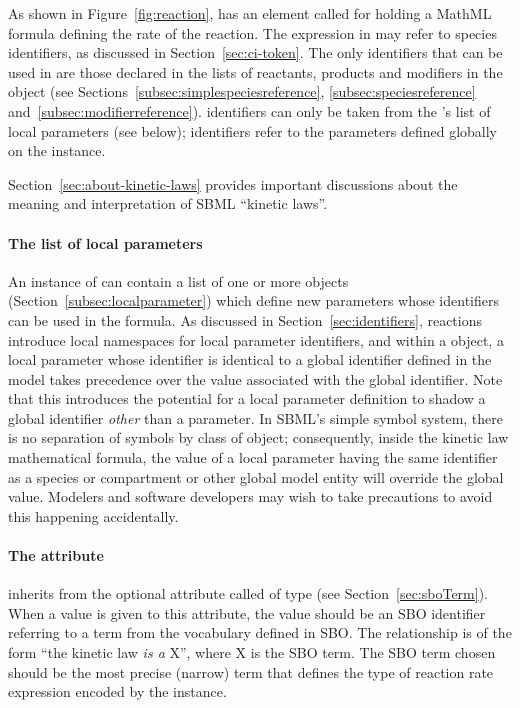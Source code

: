 As shown in Figure~\vref{fig:reaction}, \KineticLaw 
has an element called  for holding a MathML formula
defining the rate of the reaction.  The expression in 
may refer to species identifiers, as discussed in
Section~\ref{sec:ci-token}.  The only \Species identifiers that
can be used in  are those declared in the lists of
reactants, products and modifiers in the \Reaction object (see
Sections~\ref{subsec:simplespeciesreference},
\ref{subsec:speciesreference} and~\ref{subsec:modifierreference}).
\LocalParameter identifiers can only be taken from the \KineticLaw's list of
local parameters (see below); \Parameter identifiers refer to the parameters defined globally on
the \Model instance.

Section~\ref{sec:about-kinetic-laws} provides important
discussions about the meaning and interpretation of SBML ``kinetic
laws''.


\paragraph{The list of local parameters}

An instance of \KineticLaw can contain a list of
one or more \LocalParameter objects (Section~\ref{subsec:localparameter})
which define new parameters whose identifiers can be used in the
 formula.  As discussed in
Section~\ref{sec:identifiers}, reactions introduce local
namespaces for local parameter identifiers, and within a
\KineticLaw object, a local parameter whose identifier is
identical to a global identifier defined in the model takes
precedence over the value associated with
the global identifier.  Note that this introduces the potential
for a local parameter definition to shadow a global identifier
\emph{other} than a parameter.  In SBML's simple symbol system, 
there is no separation of symbols by class of object;
consequently,  inside the kinetic law mathematical
formula, the value of a local parameter having the same
identifier as a species or compartment or other global model
entity will override the global value.  Modelers and software
developers may wish to take precautions to avoid this happening
accidentally.


\paragraph{The  attribute}

\KineticLaw inherits from \SBase the optional attribute
called  of type  (see
Section~\ref{sec:sboTerm}).  When a value is given to this
attribute, the value should be an SBO identifier referring
to a term from the \sboratelaw vocabulary defined in SBO.  The
relationship is of the form ``the kinetic law \emph{is a} X'',
where X is the SBO term.  The SBO term chosen should be the most
precise (narrow) term that defines the type of reaction
  rate expression encoded by the \KineticLaw instance.


